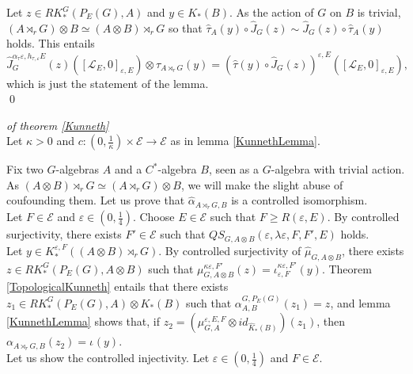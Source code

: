 \begin{dem}
Let $z\in RK_*^G(P_E(G),A)$ and $y\in K_*(B)$. As the action of $G$ on $B$ is trivial, $(A\rtimes_r G)\otimes B\simeq (A\otimes B)\rtimes_r G$ so that $\hat\tau_A(y)\circ \hat J_{G}(z) \sim \hat J_{G}(z)\circ \hat\tau_A(y) $ holds. This entails
\[\hat J_G^{\alpha_\tau\varepsilon, h_{\tau,\varepsilon}E}(z)\left([\mathcal L_E,0]_{\varepsilon, E} \right)\otimes \tau_{A\rtimes_r G}(y) = 
\left( \hat\tau(y)\circ \hat J_G(z) \right)^{\varepsilon, E}\left([\mathcal L_E,0]_{\varepsilon, E}\right),\]
which is just the statement of the lemma.\\
\qed
\end{dem}


\begin{dem} \textit{of theorem \ref{Kunneth}}\\
Let $\kappa>0$ and $c : (0,\frac{1}{\kappa})\times\mathcal E\rightarrow \mathcal E$ as in lemma \ref{KunnethLemma}.

Fix two $G$-algebras $A$ and a $C^*$-algebra $B$, seen as a $G$-algebra with trivial action. As $(A\otimes B)\rtimes_r G \simeq (A\rtimes_r G)\otimes B$, we will make the slight abuse of coufounding them. Let us prove that $\hat \alpha_{A\rtimes_r G,B}$ is a controlled isomorphism.\\

Let $F\in\mathcal E$ and $\varepsilon\in (0,\frac{1}{4})$. Choose $E \in\mathcal E$ such that $F\geq R(\varepsilon,E)$. By controlled surjectivity, there exists $F'\in \mathcal E$ such that $QS_{G,A\otimes B}(\varepsilon,\lambda\varepsilon, F,F',E)$ holds.\\

Let $y\in K^{\varepsilon,F}_*((A\otimes B)\rtimes_r G)$. By controlled surjectivity of $\hat\mu_{G,A\otimes B}$, there exists $z\in RK_*^G(P_E(G), A\otimes B) $ such that $\mu_{G,A\otimes B}^{\kappa\varepsilon,F'}(z)=\iota_{\varepsilon,F}^{\kappa\varepsilon,F'}(y)$. Theorem \ref{TopologicalKunneth} entails that there exists $z_1 \in RK_*^G(P_E(G),A)\otimes K_*(B) $ such that $\alpha_{A,B}^{G,P_E(G)}(z_1)=z$, and lemma \ref{KunnethLemma} shows that, if $z_2=(\mu_{G,A}^{\varepsilon,E,F} \otimes id_{\hat K_*(B)})(z_1)$, then $\alpha_{A\rtimes_r G,B}(z_2)=\iota_{}^{}(y)$.\\

Let us show the controlled injectivity. Let $\varepsilon\in(0,\frac{1}{4})$ and $F\in\mathcal E$.\\ 


\end{dem}
